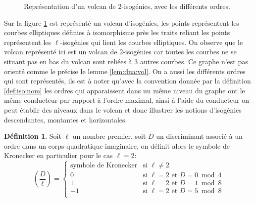 \documentclass[10pt,a4paper]{book}
\theoremstyle{plain}
\theoremstyle{definition}
\theoremstyle{definition}
\theoremstyle{definition}
\theoremstyle{definition}
\newtheorem{defi}[thm]{Définition}
\theoremstyle{remark}
\theoremstyle{remark}
\theoremstyle{definition}
\begin{document}
\begin{figure}
\begin{center}
\begin{tikzpicture}[scale=0.60]


\end{tikzpicture}
\end{center}
\caption{Représentation d'un volcan de $2$-isogénies, avec les différents ordres.}		
\label{fig:ord:vol}
\end{figure}
Sur la figure \ref{fig:ord:vol} est représenté un volcan d'isogénies, les points représentent les courbes elliptiques définies à isomorphisme près les traits reliant les points représentent les $\ell$-isogénies qui lient les courbes elliptiques. On observe que le volcan représenté ici est un volcan de $2$-isogénies car toutes les courbes ne se situant pas en bas du volcan sont reliées à $3$ autres courbes. Ce graphe n'est pas orienté comme le précise le lemme \ref{lem:dua:vol}. On a aussi les différents ordres qui sont représentés, ils est à noter qu'avec la convention donnée par la définition \ref{def:iso:nom} les ordres qui apparaissent dans un même niveau du graphe ont le même conducteur par rapport à l'ordre maximal, ainsi à l'aide du conducteur on peut établir des niveaux dans le volcan et donc illustrer les notions d'isogénies descendantes, montantes et horizontales. 

\begin{defi}
Soit $\ell$ un nombre premier, soit $D$ un discriminant associé à un ordre dans
un corps quadratique imaginaire, on définit alors le symbole de Kronecker en 
particulier pour le cas $\ell=2$:
\begin{equation*}
\left( \frac{D}{\ell} \right)= \begin{cases}
  \text{symbole de Kronecker} & \text{si } \ell\neq 2 \\
0 & \text{si } \ell=2 \text{ et } D=0 \bmod 4 \\
1 & \text{si } \ell=2 \text{ et } D=1 \bmod 8 \\
-1 & \text{si } \ell=2 \text{ et } D=5 \bmod 8 \\
\end{cases}
\end{equation*}
\end{defi}
\end{document}
